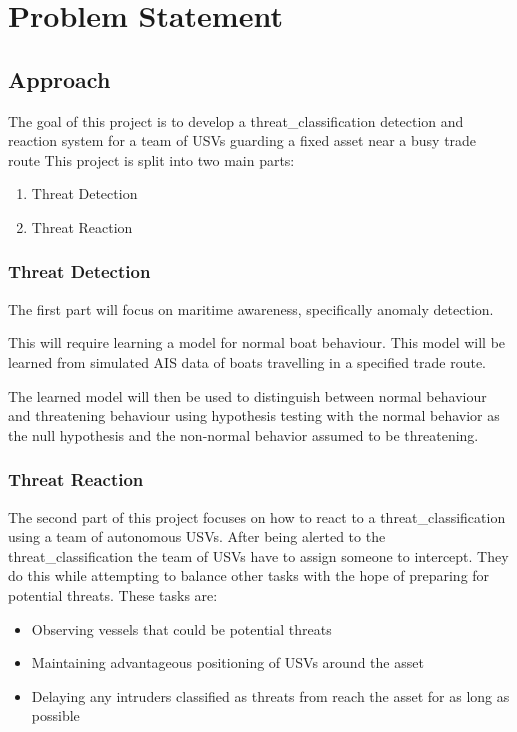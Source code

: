 \documentclass[bsc,frontabs,twoside,singlespacing,parskip,deptreport]{infthesis}     %
\begin{document}
\section{Problem Statement}
\subsection{Approach}
The goal of this project is to develop a threat_classification detection and reaction system for a team of USVs guarding a fixed asset near a busy trade route
This project is split into two main parts:
\begin{enumerate}
    \item Threat Detection
    \item Threat Reaction
\end{enumerate}

\subsubsection{Threat Detection}
The first part will focus on maritime awareness, specifically anomaly detection.

This will require learning a model for normal boat behaviour. This model will be learned from simulated AIS data of boats travelling in a specified trade route.

The learned model will then be used to distinguish between normal behaviour and threatening behaviour using hypothesis testing with the normal behavior as the null hypothesis and the non-normal behavior assumed to be threatening.

\subsubsection{Threat Reaction}
The second part of this project focuses on how to react to a threat_classification using a team of autonomous USVs.
After being alerted to the threat_classification the team of USVs have to assign someone to intercept. They do this while attempting to balance other tasks with the hope of preparing for potential threats.
These tasks are:
\begin{itemize}
    \item Observing vessels that could be potential threats
    \item Maintaining advantageous positioning of USVs around the asset
    \item Delaying any intruders classified as threats from reach the asset for as long as possible
\end{itemize}
\end{document}

